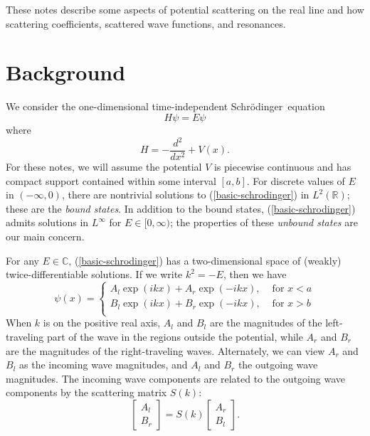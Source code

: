 \documentclass{article}
\newcommand{\schrodinger}{Schr\"{o}dinger}
\newcommand{\bbR}{\mathbb{R}}
\newcommand{\bbC}{\mathbb{C}}
\begin{document}
These notes describe some aspects of potential scattering on the real line
and how scattering coefficients, scattered wave functions, and resonances.

\section{Background}

We consider the one-dimensional time-independent \schrodinger\ equation
\begin{equation}
  H \psi = E \psi
  \label{basic-schrodinger}
\end{equation}
where
\begin{equation}
  H = -\frac{d^2}{dx^2} + V(x).
\end{equation}
For these notes, we will assume the potential $V$ is piecewise
continuous and has compact support contained within some interval
$[a,b]$.  For discrete values of $E$ in $(-\infty,0)$, there are
nontrivial solutions to (\ref{basic-schrodinger}) in $L^2(\bbR)$;
these are the \emph{bound states}.  In addition to the bound states,
(\ref{basic-schrodinger}) admits solutions in $L^{\infty}$ for $E \in
[0,\infty)$; the properties of these \emph{unbound states} are our
main concern.

For any $E \in \bbC$, (\ref{basic-schrodinger}) has a two-dimensional
space of (weakly) twice-differentiable solutions.  If we write $k^2 =
-E$, then we have
\begin{equation}
  \psi(x) = \left\{
    \begin{array}{ll}
    A_l \exp(ikx) + A_r \exp(-ikx), & \mbox{ for } x < a \\
    B_l \exp(ikx) + B_r \exp(-ikx), & \mbox{ for } x > b \\
    \end{array}
  \right.
\end{equation}
When $k$ is on the positive real axis, $A_l$ and $B_l$ are the magnitudes
of the left-traveling part of the wave in the regions outside the potential,
while $A_r$ and $B_r$ are the magnitudes of the right-traveling waves.
Alternately, we can view $A_r$ and $B_l$ as the incoming wave magnitudes,
and $A_l$ and $B_r$ the outgoing wave magnitudes.  The incoming wave
components are related to the outgoing wave components by the
scattering matrix $S(k)$:
\begin{equation}
  \begin{bmatrix} A_l \\ B_r \end{bmatrix} =
  S(k)
  \begin{bmatrix} A_r \\ B_l \end{bmatrix}.
\end{equation}
\end{document}
